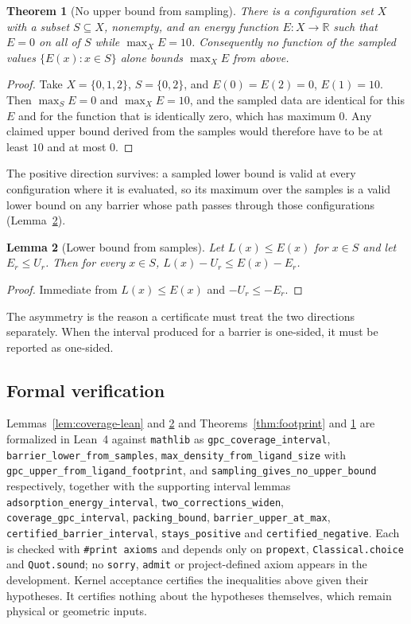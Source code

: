 \documentclass[11pt,a4paper]{article}
\theoremstyle{plain}
\newtheorem{theorem}{Theorem}[section]
\newtheorem{lemma}[theorem]{Lemma}
\theoremstyle{definition}
\theoremstyle{remark}
\newcommand{\R}{\mathbb{R}}
\begin{document}
\begin{theorem}[No upper bound from sampling]
\label{thm:nosampling}
There is a configuration set $X$ with a subset $S\subseteq X$, nonempty, and an
energy function $E:X\to\R$ such that $E=0$ on all of $S$ while
$\max_X E = 10$. Consequently no function of the sampled values
$\{E(x):x\in S\}$ alone bounds $\max_X E$ from above.
\end{theorem}
\begin{proof}
Take $X=\{0,1,2\}$, $S=\{0,2\}$, and $E(0)=E(2)=0$, $E(1)=10$. Then
$\max_S E = 0$ and $\max_X E = 10$, and the sampled data are identical for this
$E$ and for the function that is identically zero, which has maximum $0$. Any
claimed upper bound derived from the samples would therefore have to be at
least $10$ and at most $0$.
\end{proof}

The positive direction survives: a sampled lower bound is valid at every
configuration where it is evaluated, so its maximum over the samples is a valid
lower bound on any barrier whose path passes through those configurations
(Lemma~\ref{lem:sample-lower}).

\begin{lemma}[Lower bound from samples]
\label{lem:sample-lower}
Let $L(x)\le E(x)$ for $x\in S$ and let $E_r\le U_r$. Then for every $x\in S$,
$L(x)-U_r \le E(x)-E_r$.
\end{lemma}
\begin{proof}
Immediate from $L(x)\le E(x)$ and $-U_r\le-E_r$.
\end{proof}

The asymmetry is the reason a certificate must treat the two directions
separately. When the interval produced for a barrier is one-sided, it must be
reported as one-sided.

\subsection{Formal verification}

Lemmas~\ref{lem:coverage-lean} and \ref{lem:sample-lower} and
Theorems~\ref{thm:footprint} and \ref{thm:nosampling} are formalized in Lean~4
against \texttt{mathlib} as \texttt{gpc\_coverage\_interval},
\texttt{barrier\_lower\_from\_samples},
\texttt{max\_density\_from\_ligand\_size} with
\texttt{gpc\_upper\_from\_ligand\_footprint}, and
\texttt{sampling\_gives\_no\_upper\_bound} respectively, together with the
supporting interval lemmas \texttt{adsorption\_energy\_interval},
\texttt{two\_corrections\_widen}, \texttt{coverage\_gpc\_interval},
\texttt{packing\_bound}, \texttt{barrier\_upper\_at\_max},
\texttt{certified\_barrier\_interval}, \texttt{stays\_positive} and
\texttt{certified\_negative}. Each is checked with \texttt{\#print axioms} and
depends only on \texttt{propext}, \texttt{Classical.choice} and
\texttt{Quot.sound}; no \texttt{sorry}, \texttt{admit} or project-defined axiom
appears in the development. Kernel acceptance certifies the inequalities above
given their hypotheses. It certifies nothing about the hypotheses themselves,
which remain physical or geometric inputs.
\end{document}
